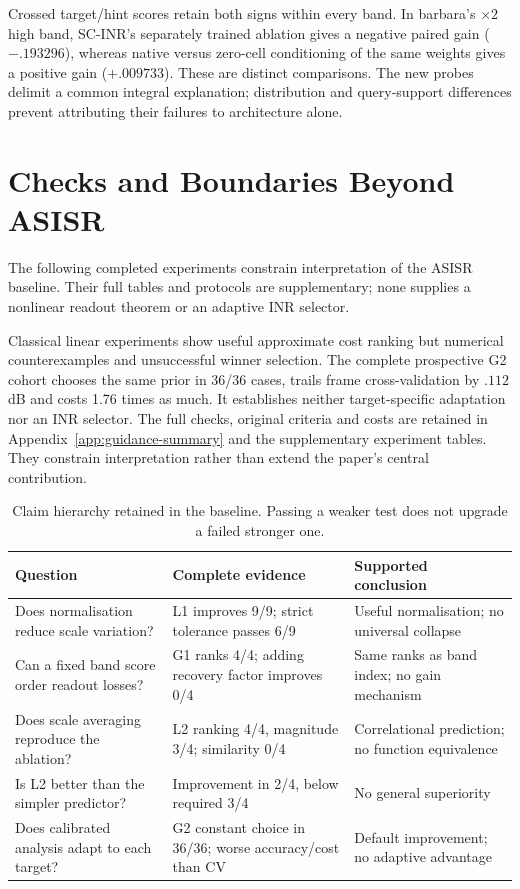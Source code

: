 Crossed target/hint scores retain both signs within every band. In barbara's $\times2$ high band, SC-INR's separately trained ablation gives a negative paired gain ($-.193296$), whereas native versus zero-cell conditioning of the same weights gives a positive gain ($+.009733$). These are distinct comparisons. The new probes delimit a common integral explanation; distribution and query-support differences prevent attributing their failures to architecture alone.

\section{Checks and Boundaries Beyond ASISR}\label{sec:boundary}
The following completed experiments constrain interpretation of the ASISR baseline. Their full tables and protocols are supplementary; none supplies a nonlinear readout theorem or an adaptive INR selector.

Classical linear experiments show useful approximate cost ranking but numerical counterexamples and unsuccessful winner selection. The complete prospective G2 cohort chooses the same prior in 36/36 cases, trails frame cross-validation by $.112$ dB and costs 1.76 times as much. It establishes neither target-specific adaptation nor an INR selector. The full checks, original criteria and costs are retained in Appendix~\ref{app:guidance-summary} and the supplementary experiment tables. They constrain interpretation rather than extend the paper's central contribution.

\begin{table}[t]\centering\small
\caption{Claim hierarchy retained in the baseline. Passing a weaker test does not upgrade a failed stronger one.}\label{tab:claims-main}
\begin{tabular}{p{}p{}p{}}\toprule
Question & Complete evidence & Supported conclusion\\\midrule
Does normalisation reduce scale variation? & L1 improves 9/9; strict tolerance passes 6/9 & Useful normalisation; no universal collapse\\
Can a fixed band score order readout losses? & G1 ranks 4/4; adding recovery factor improves 0/4 & Same ranks as band index; no gain mechanism\\
Does scale averaging reproduce the ablation? & L2 ranking 4/4, magnitude 3/4; similarity 0/4 & Correlational prediction; no function equivalence\\
Is L2 better than the simpler predictor? & Improvement in 2/4, below required 3/4 & No general superiority\\
Does calibrated analysis adapt to each target? & G2 constant choice in 36/36; worse accuracy/cost than CV & Default improvement; no adaptive advantage\\\bottomrule
\end{tabular}
\end{table}

